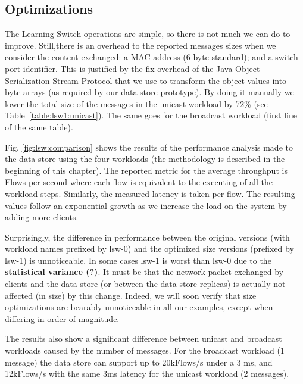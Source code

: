 \subsection{Optimizations}
\label{sec:optimizations-2}
The Learning Switch operations are simple, so there is not much we can do to improve. 
Still,there is an overhead to the reported messages sizes when we consider the content exchanged: a MAC address (6 byte standard); and a switch port identifier.  
This  is justified by the fix overhead of the Java Object Serialization Stream Protocol that we use to transform the object values into byte arrays (as required by our data store prototype). 
By doing it  manually  we lower the total size of the messages in the unicast workload by 72\% (see Table~\ref{table:lsw1:unicast}). The same goes for the broadcast workload (first line of the same table). 

Fig. \ref{fig:lsw:comparison} shows the results of the performance analysis made to the data store using the four workloads (the methodology is described in the beginning of this chapter). 
The reported metric for the average throughput  is Flows per second where each flow  is equivalent to the executing of all the workload steps. Similarly, the measured latency is taken per flow. 
The resulting values follow an exponential growth as we increase the load on the system by adding more clients. 

Surprisingly, the difference in performance between the original versions (with workload names prefixed by lsw-0) and the optimized size versions (prefixed by lsw-1) is unnoticeable. In some cases lsw-1 is worst than lsw-0 due to the \textbf{statistical variance (?)}. 
It must be that the network packet exchanged by clients and the data store (or between the data store replicas) is actually not affected (in size) by this change. 
Indeed, we will soon verify that size optimizations are bearably unnoticeable in all our examples, except when differing in order of magnitude. 

The results also show a significant difference between unicast and broadcast workloads caused by the number of messages. 
For the broadcast workload (1 message) the data store can support up to 20kFlows/s under a 3 ms, and 
12kFlows/s with the same 3ms latency  for the unicast workload (2 messages). 

